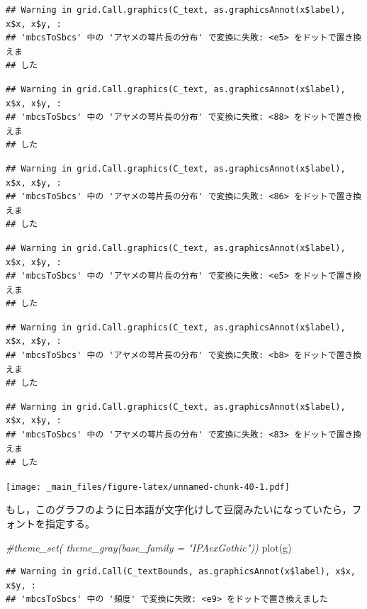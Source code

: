 \documentclass[
]{book}
\newenvironment{Shaded}{\begin{snugshade}}{\end{snugshade}}
\newcommand{\CommentTok}[1]{\textcolor[rgb]{0.56,0.35,0.01}{\textit{#1}}}
\newcommand{\FunctionTok}[1]{\textcolor[rgb]{0.00,0.00,0.00}{#1}}
\newcommand{\NormalTok}[1]{#1}
\begin{document}
\begin{verbatim}
## Warning in grid.Call.graphics(C_text, as.graphicsAnnot(x$label), x$x, x$y, :
## 'mbcsToSbcs' 中の 'アヤメの萼片長の分布' で変換に失敗: <e5> をドットで置き換えま
## した
\end{verbatim}

\begin{verbatim}
## Warning in grid.Call.graphics(C_text, as.graphicsAnnot(x$label), x$x, x$y, :
## 'mbcsToSbcs' 中の 'アヤメの萼片長の分布' で変換に失敗: <88> をドットで置き換えま
## した
\end{verbatim}

\begin{verbatim}
## Warning in grid.Call.graphics(C_text, as.graphicsAnnot(x$label), x$x, x$y, :
## 'mbcsToSbcs' 中の 'アヤメの萼片長の分布' で変換に失敗: <86> をドットで置き換えま
## した
\end{verbatim}

\begin{verbatim}
## Warning in grid.Call.graphics(C_text, as.graphicsAnnot(x$label), x$x, x$y, :
## 'mbcsToSbcs' 中の 'アヤメの萼片長の分布' で変換に失敗: <e5> をドットで置き換えま
## した
\end{verbatim}

\begin{verbatim}
## Warning in grid.Call.graphics(C_text, as.graphicsAnnot(x$label), x$x, x$y, :
## 'mbcsToSbcs' 中の 'アヤメの萼片長の分布' で変換に失敗: <b8> をドットで置き換えま
## した
\end{verbatim}

\begin{verbatim}
## Warning in grid.Call.graphics(C_text, as.graphicsAnnot(x$label), x$x, x$y, :
## 'mbcsToSbcs' 中の 'アヤメの萼片長の分布' で変換に失敗: <83> をドットで置き換えま
## した
\end{verbatim}

\texttt{[image: \_main\_files/figure-latex/unnamed-chunk-40-1.pdf]}

もし，このグラフのように日本語が文字化けして豆腐みたいになっていたら，フォントを指定する。

\begin{Shaded}
\begin{Highlighting}[]
\CommentTok{\#theme\_set( theme\_gray(base\_family = "IPAexGothic"))}
\FunctionTok{plot}\NormalTok{(g)}
\end{Highlighting}
\end{Shaded}

\begin{verbatim}
## Warning in grid.Call(C_textBounds, as.graphicsAnnot(x$label), x$x, x$y, :
## 'mbcsToSbcs' 中の '頻度' で変換に失敗: <e9> をドットで置き換えました
\end{verbatim}
\end{document}
